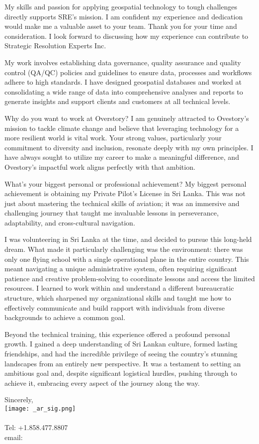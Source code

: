 \documentclass[letterpaper]{article}
\begin{document}
My skills and passion for applying geospatial technology to tough
challenges directly supports SRE’s mission.
I am confident my experience and dedication would make me a valuable asset to your team.
Thank you for your time and consideration.
I look forward to discussing how my experience can contribute to Strategic Resolution Experts Inc.

My work involves establishing data governance, quality assurance and quality control (QA/QC)
policies and guidelines to ensure data, processes and workflows adhere to high standards.
I have designed geospatial databases and worked at consolidating
a wide range of data into comprehensive analyses and reports to generate
insights and support clients and customers at all technical levels.

Why do you want to work at Overstory?
I am genuinely attracted to Ovestory's mission to tackle climate change and believe that leveraging technology for a more resilient world is vital work.  Your strong values, particularly your commitment to diversity and inclusion, resonate deeply with my own principles. I have always sought to utilize my career to make a meaningful difference, and Ovestory's impactful work aligns perfectly with that ambition.

What's your biggest personal or professional achievement?
My biggest personal achievement is obtaining my Private Pilot's License in Sri Lanka. This was not just about mastering the technical skills of aviation; it was an immersive and challenging journey that taught me invaluable lessons in perseverance, adaptability, and cross-cultural navigation.

I was volunteering in Sri Lanka at the time, and decided to pursue this long-held dream. What made it particularly challenging was the environment: there was only one flying school with a single operational plane in the entire country. This meant navigating a unique administrative system, often requiring significant patience and creative problem-solving to coordinate lessons and access the limited resources. I learned to work within and understand a different bureaucratic structure, which sharpened my organizational skills and taught me how to effectively communicate and build rapport with individuals from diverse backgrounds to achieve a common goal.

Beyond the technical training, this experience offered a profound personal growth. I gained a deep understanding of Sri Lankan culture, formed lasting friendships, and had the incredible privilege of seeing the country's stunning landscapes from an entirely new perspective. It was a testament to setting an ambitious goal and, despite significant logistical hurdles, pushing through to achieve it, embracing every aspect of the journey along the way.
\fi

Sincerely,\\
    \hspace{1em}
    \texttt{[image: \_ar\_sig.png]} \\
    \CVsigname \\
    \small
    Tel: +1.858.477.8807\\
    email: \CVemail
\end{document}
